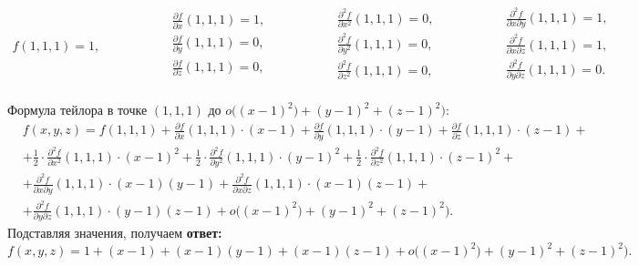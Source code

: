 \begin{equation*}
	\begin{aligned}
		f(1,1,1) = 1,
	\end{aligned}\qquad\qquad
	\begin{aligned}
		&\frac{\partial f}{\partial x} (1,1,1) = 1,\\[5pt]
		&\frac{\partial f}{\partial y} (1,1,1) = 0,\\[5pt]
		&\frac{\partial f}{\partial z} (1,1,1) = 0,\\[5pt]
	\end{aligned} \qquad\qquad
	\begin{aligned}
		&\frac{\partial^2 f}{\partial x^2} (1,1,1) = 0,\\[5pt]
		&\frac{\partial^2 f}{\partial y^2} (1,1,1) = 0,\\[5pt]
		&\frac{\partial^2 f}{\partial z^2} (1,1,1) = 0,\\[5pt]
	\end{aligned} \qquad\qquad
	\begin{aligned}
		&\frac{\partial^2 f}{\partial x\partial y} (1,1,1) = 1,\\[5pt]
		&\frac{\partial^2 f}{\partial x \partial z} (1,1,1) = 1,\\[5pt]
		&\frac{\partial^2 f}{\partial y \partial z} (1,1,1) = 0.\\[5pt]
	\end{aligned}
\end{equation*}

Формула тейлора в точке $(1,1,1)$ до $o\bigl((x-1)^2) + (y-1)^2 + (z-1)^2\bigr)$:
\begin{equation*}
	\begin{aligned}
		&f(x,y,z) = f(1,1,1) +\frac{\partial f}{\partial x}(1,1,1) \cdot(x-1) + \frac{\partial f}{\partial y}(1,1,1) \cdot (y-1) + \frac{\partial f}{\partial z}(1,1,1) \cdot(z-1) + {}\\
		{} &+\frac12\cdot\frac{\partial^2 f}{\partial x^2}(1,1,1)\cdot (x-1)^2 + \frac12\cdot\frac{\partial^2 f}{\partial y^2}(1,1,1) \cdot (y-1)^2 + \frac12\cdot\frac{\partial^2 f}{\partial z^2}(1,1,1)\cdot (z-1)^2 + {}\\
		{} &+\frac{\partial^2 f}{\partial x\partial y}(1,1,1) \cdot(x-1)(y-1) + \frac{\partial^2 f}{\partial x\partial z}(1,1,1) \cdot (x-1)(z-1) + {}\\ {} &+ \frac{\partial^2 f}{\partial y \partial z}(1,1,1) \cdot(y-1)(z-1) + {} o\bigl((x-1)^2) + (y-1)^2 + (z-1)^2\bigr).
	\end{aligned}
\end{equation*}
Подставляя значения, получаем \textbf{ответ:} 
\[f(x,y,z) = 1 + (x-1) + (x-1)(y-1) + (x-1)(z-1) + o\bigl((x-1)^2) + (y-1)^2 + (z-1)^2\bigr).\]
\vspace{0.5cm}